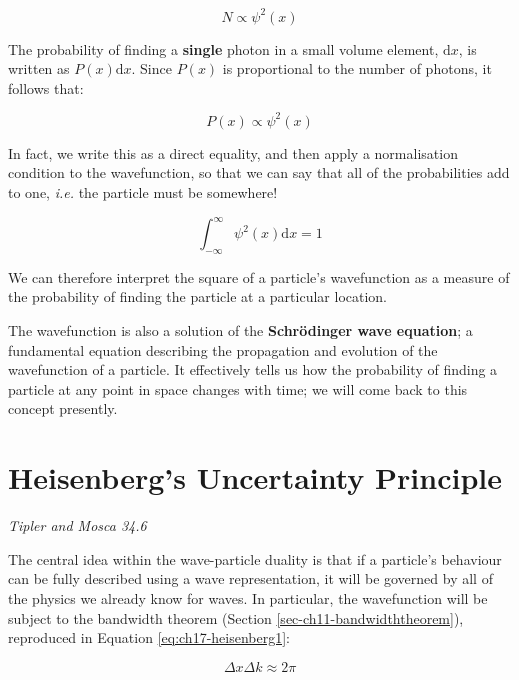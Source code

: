 \documentclass[
]{book}
\begin{document}
\begin{equation}
N \propto \psi^2 (x)
\end{equation}

The probability of finding a \textbf{single} photon in a small volume element, \(\textrm{d}x\), is written as \(P(x) \mathrm{d}x\). Since \(P(x)\) is proportional to the number of photons, it follows that:

\begin{equation}
P(x) \propto \psi^2 (x)
\end{equation}

In fact, we write this as a direct equality, and then apply a normalisation condition to the wavefunction, so that we can say that all of the probabilities add to one, \emph{i.e.} the particle must be somewhere!

\begin{equation}
\int_{-\infty}^{\infty} \psi^2 (x) \mathrm{d}x = 1
\end{equation}

We can therefore interpret the square of a particle's wavefunction as a measure of the probability of finding the particle at a particular location.

The wavefunction is also a solution of the \textbf{Schrödinger wave equation}; a fundamental equation describing the propagation and evolution of the wavefunction of a particle. It effectively tells us how the probability of finding a particle at any point in space changes with time; we will come back to this concept presently.

\hypertarget{sec-ch17-heisenberg1}{%
\section{Heisenberg's Uncertainty Principle}\label{sec-ch17-heisenberg1}}

\emph{Tipler and Mosca 34.6}

The central idea within the wave-particle duality is that if a particle's behaviour can be fully described using a wave representation, it will be governed by all of the physics we already know for waves. In particular, the wavefunction will be subject to the bandwidth theorem (Section \ref{sec-ch11-bandwidththeorem}), reproduced in Equation \eqref{eq:ch17-heisenberg1}:

\begin{equation}
 \Delta x \Delta k \approx 2\pi
 \label{eq:ch17-heisenberg1}
\end{equation}
\end{document}
